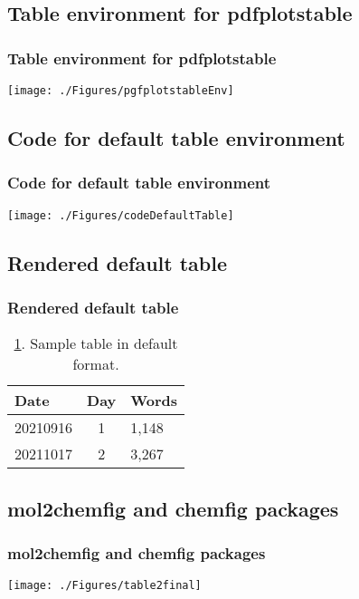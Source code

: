 \documentclass{beamer}
\begin{document}
\subsection{Table environment for pdfplotstable}
\begin{frame}
\frametitle{Table environment for pdfplotstable}
\begin{center}
    \texttt{[image: ./Figures/pgfplotstableEnv]}
\end{center}
\end{frame}
\note{}


\subsection{Code for default table environment}
\begin{frame}
\frametitle{Code for default table environment}
\begin{center}
    \texttt{[image: ./Figures/codeDefaultTable]}
\end{center}
\end{frame}
\note{}


\subsection{Rendered default table}
\begin{frame}
\frametitle{Rendered default table}
\begin{table}[htp]
    \centering
    \begin{tabular}{lcl}
       \hline
       Date & Day & Words \\ 
       \hline
        20210916 & 1 & 1,148  \\
        20211017 & 2 & 3,267 \\
       \hline    
    \end{tabular}
    \caption{\ref{tab:simpleTable}. Sample table in default format. }
    \label{tab:simpleTable}
\end{table}
\end{frame}
\note{}


\subsection{mol2chemfig and chemfig packages}
\begin{frame}
\frametitle{mol2chemfig and chemfig packages}
\begin{center}
    \texttt{[image: ./Figures/table2final]}
\end{center}
\end{frame}
\note{}
\end{document}
